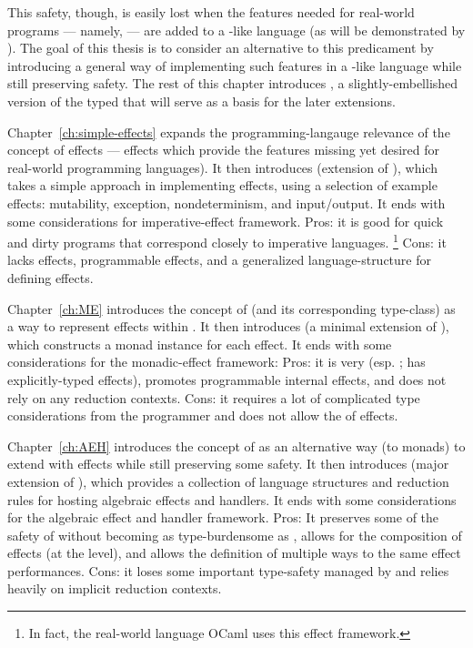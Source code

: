 This safety, though, is easily lost when the features needed for real-world programs --- namely,  --- are added to a \lc-like language (as will be demonstrated by \LangB).
The goal of this thesis is to consider an alternative to this predicament by introducing a general way of implementing such features in a \lc-like language while still preserving safety.
The rest of this chapter introduces \LangA, a slightly-embellished version of the typed \lc that will serve as a basis for the later extensions.

Chapter~\ref{ch:simple-effects} expands the programming-langauge relevance of the concept of effects --- effects which provide the features missing yet desired for real-world programming languages).
It then introduces \LangB (extension of \LangA), which takes a simple approach in implementing  effects, using a selection of example effects: mutability, exception, nondeterminism, and input/output.
It ends with some considerations for imperative-effect framework.
Pros: it is good for quick and dirty programs that correspond closely to imperative languages.%
\footnote{
  In fact, the real-world language OCaml uses this effect framework.
}
Cons: it  lacks  effects, programmable  effects, and a generalized language-structure for defining effects.

Chapter~\ref{ch:ME} introduces the concept of  (and its corresponding type-class) as a way to represent effects within \LangA.
It then introduces \LangC (a minimal extension of \LangA), which constructs a monad instance for each effect.
It ends with some considerations for the monadic-effect framework:
Pros: it is very  (esp. ; has explicitly-typed effects), promotes programmable internal effects, and does not rely on any reduction contexts.
Cons: it requires a lot of complicated type considerations from the programmer and does not allow the  of effects.

Chapter~\ref{ch:AEH} introduces the concept of  as an alternative way (to monads) to extend \LangA with effects while still preserving some safety.
It then introduces \LangD (major extension of \LangA), which provides a collection of language structures and reduction rules for hosting algebraic effects and handlers.
It ends with some considerations for the algebraic effect and handler framework.
Pros: It preserves some of the safety of \LangA without becoming as type-burdensome as \LangC, allows for the composition of effects (at the  level), and allows the definition of multiple ways to  the same effect performances.
Cons: it loses some important type-safety managed by \LangC and relies heavily on implicit reduction contexts.

